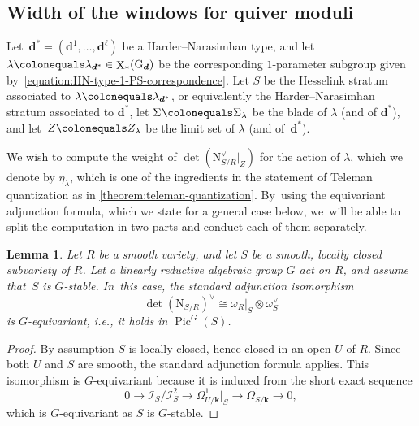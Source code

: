 \documentclass[JEP,XML,SOM,Unicode,NoEqCountersInSection,published]{cedram}
\theoremstyle{plain}
\newtheorem{lemma}[theorem]{Lemma}
\theoremstyle{definition}
\DeclareMathOperator\characters{X}
\DeclareMathOperator\Pic{Pic}
\newcommand\blade[1][]{\Sigma_{#1}}
\newcommand\field{\mathbf{k}}
\newcommand\group[1][\tuple{d}]{\mathrm{G}_{#1}}
\newcommand\limitset[1][\lambda]{Z_{#1}}
\newcommand\normal{\ensuremath{\mathrm{N}}}
\newcommand\tuple[1]{\ensuremath{{\boldsymbol{#1}}}}
\begin{document}
\subsection{Width of the windows for quiver moduli}
\label{subsection:width}
Let~$\tuple{d}^*=(\tuple{d}^1,\ldots,\tuple{d}^\ell)$ be a Harder--Narasimhan type,
and let $\lambda \colonequals \lambda_{\tuple{d}^*} \in \characters_*({\group})$ be
the corresponding $1$\nobreakdash-parameter subgroup given by~\eqref{equation:HN-type-1-PS-correspondence}.
Let $S$ be the Hesselink stratum associated to $\lambda\colonequals\lambda_{\tuple{d}^*}$,
or equivalently the Harder--Narasimhan stratum associated to $\tuple{d}^*$,
let $\blade\colonequals\blade[\lambda]$ be the blade of $\lambda$ (and of $\tuple{d}^*$),
and let~$\limitset[]\colonequals\limitset[\lambda]$ be the limit set of $\lambda$ (and of~$\tuple{d}^*$).

We wish to compute the weight of $\det(\normal_{S/R}^\vee|_Z)$
for the action of $\lambda$,
which we denote by $\eta_\lambda$,
which is one of the ingredients in the statement of Teleman quantization as in \cref{theorem:teleman-quantization}. By~using the equivariant adjunction formula,
which we state for a general case below, we~will be able to split the computation in two parts and conduct each of them separately.
\begin{lemma}
\label{lemma:determinant-normal-bundle-sequence}
Let $R$ be a smooth variety,
and let $S$ be a smooth, locally closed subvariety of $R$.
Let a linearly reductive algebraic group $G$ act on $R$,
and assume that~$S$ is $G$-stable. In~this case, the standard adjunction isomorphism
\begin{equation}
\label{equation:equivariant-adjunction}
\det(\normal_{S/R})^\vee \cong \omega_R|_S \otimes \omega_S^\vee
\end{equation}
is $G$-equivariant, i.e., it holds in $\Pic^G(S)$.
\end{lemma}

\begin{proof}
By assumption $S$ is locally closed,
hence closed in an open $U$ of $R$.
Since both $U$ and $S$ are smooth,
the standard adjunction formula applies. This isomorphism is $G$-equivariant because it is induced from the short exact sequence
\begin{equation*}
0 \to \mathcal{I}_{S}/\mathcal{I}^2_{S} \to \Omega^{1}_{U/\field}|_{S} \to \Omega^{1}_{S/\field} \to 0,
\end{equation*}
which is $G$-equivariant as $S$ is $G$-stable.
\end{proof}
\end{document}
